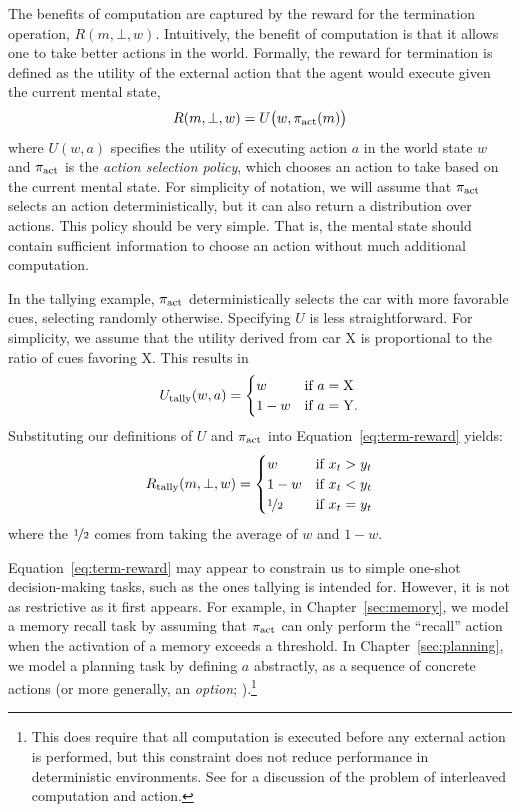 The benefits of computation are captured by the reward for the termination operation, $R(m, \bot, w)$. Intuitively, the benefit of computation is that it allows one to take better actions in the world. Formally, the reward for termination is defined as the utility of the external action that the agent would execute given the current mental state,
%
\begin{equation}\label{eq:term-reward}
  R(m, \bot, w) = U \big(w, \pi_{\text{act}}(m) \big)
\end{equation}
%
where $U(w, a)$ specifies the utility of executing action $a$ in the world state $w$ and $\pi_{\text{act}}$ is the \emph{action selection policy}, which chooses an action to take based on the current mental state. For simplicity of notation, we will assume that $\pi_{\text{act}}$ selects an action deterministically, but it can also return a distribution over actions. This policy should be very simple. That is, the mental state should contain sufficient information to choose an action without much additional computation.

In the tallying example, $\pi_{\text{act}}$ deterministically selects the car with more favorable cues, selecting randomly otherwise. Specifying $U$ is less straightforward. For simplicity, we assume that the utility derived from car X is proportional to the ratio of cues favoring X. This results in
\begin{equation}
  U_{\text{tally}}(w, a) = \begin{cases}
    w &\text{if } a = \mathrm{X} \\
    1-w &\text{if } a = \mathrm{Y}.
  \end{cases}
\end{equation}
Substituting our definitions of $U$ and $\pi_{\text{act}}$ into Equation~\ref{eq:term-reward} yields:
\begin{equation}
  R_{\text{tally}}(m, \bot, w) = \begin{cases}
    w &\text{if } x_t > y_t \\
    1-w &\text{if } x_t < y_t \\
    \nicefrac{1}{2} &\text{if } x_t = y_t
  \end{cases}
\end{equation}
where the $\nicefrac{1}{2}$ comes from taking the average of $w$ and $1 - w$.

Equation~\ref{eq:term-reward} may appear to constrain us to simple one-shot decision-making tasks, such as the ones tallying is intended for. However, it is not as restrictive as it first appears. For example, in Chapter~\ref{sec:memory}, we model a memory recall task by assuming that $\pi_{\text{act}}$ can only perform the ``recall'' action when the activation of a memory exceeds a threshold. In Chapter~\ref{sec:planning}, we model a planning task by defining $a$ abstractly, as a sequence of concrete actions (or more generally, an \emph{option}; \citealp{sutton1999mdps}).\footnote{
  This does require that all computation is executed before any external action is performed, but this constraint does not reduce performance in deterministic environments. See \conclusion for a discussion of the problem of interleaved computation and action.
} 

